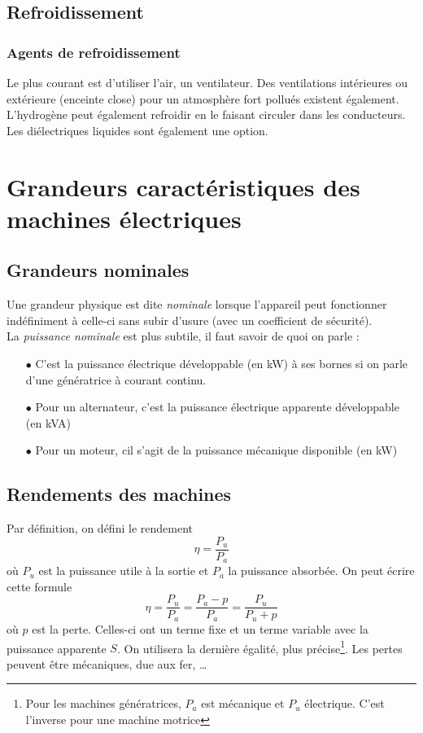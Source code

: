 	\subsection{Refroidissement}
		\subsubsection{Agents de refroidissement}
		Le plus courant est d'utiliser l'air, un ventilateur. Des ventilations 
		intérieures ou extérieure (enceinte close) pour un atmosphère fort 
		pollués existent également. L'hydrogène peut également refroidir en 
		le faisant circuler dans les conducteurs. Les diélectriques liquides 
		sont également une option.
		
\section{Grandeurs caractéristiques des machines électriques}
	\subsection{Grandeurs nominales}
	Une grandeur physique est dite \textit{nominale} lorsque l'appareil peut 
	fonctionner indéfiniment à celle-ci sans subir d'usure (avec un coefficient 
	de sécurité).\\
	La \textit{puissance nominale} est plus subtile, il faut savoir de quoi on 
	parle :
	\begin{itemize}
	\item[$\bullet$] C'est la puissance électrique développable (en kW) à ses 
	bornes si on parle d'une génératrice à courant continu.
	\item[$\bullet$] Pour un alternateur, c'est la puissance électrique 
	apparente développable (en kVA)
	\item[$\bullet$] Pour un moteur, cil s'agit de la puissance mécanique 
	disponible (en kW)
	\end{itemize}
	
	
	\subsection{Rendements des machines}
	Par définition, on défini le rendement 
	\begin{equation}
	\eta = \frac{P_u}{P_a}
	\end{equation}
	où $P_u$ est la puissance utile à la sortie et $P_a$ la puissance 
	absorbée. On peut écrire cette formule
	\begin{equation}
	\eta = \frac{P_u}{P_a} = \frac{P_a-p}{P_a} = \frac{P_u}{P_u+p}
	\end{equation}
	où $p$ est la perte. Celles-ci ont un terme fixe et un terme variable avec 
	la puissance apparente $S$. On utilisera la dernière égalité, plus précise\footnote{
	Pour les machines génératrices, $P_a$ est mécanique et $P_u$ électrique. C'est 
	l'inverse pour 	une machine motrice}. Les pertes peuvent être mécaniques, 
	due aux fer, \dots\\
	
